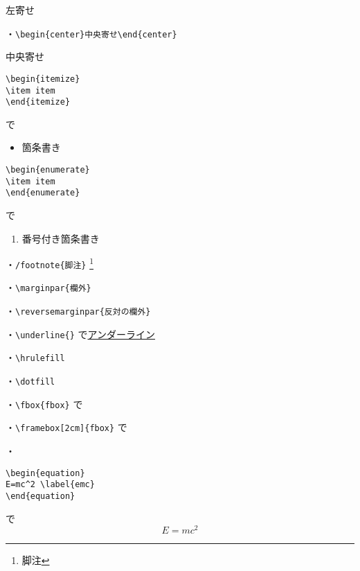 \documentclass[a4paper,12pt,papersize,twocolumn,titlepage]{jsarticle}
\begin{document}
\begin{flushleft}
  左寄せ
\end{flushleft}


・\verb"\begin{center}中央寄せ\end{center}"

\begin{center}
  中央寄せ
\end{center}


\begin{verbatim}
\begin{itemize}
\item item
\end{itemize}
\end{verbatim}
で

\begin{itemize}
  \item 箇条書き
\end{itemize}


\begin{verbatim}
\begin{enumerate}
\item item
\end{enumerate}
\end{verbatim}
で

\begin{enumerate}
  \item 番号付き箇条書き
\end{enumerate}


・\verb"/footnote{脚注}"
\footnote{脚注}


・\verb"\marginpar{欄外}"


・\verb"\reversemarginpar{反対の欄外}"{}


・\verb"\underline{}" で\underline{アンダーライン}


・\verb"\hrulefill"

\hrulefill


・\verb"\dotfill"

\dotfill


・\verb"\fbox{fbox}"
で


・\verb"\framebox[2cm]{fbox}"
で


・
\begin{verbatim}
\begin{equation}
E=mc^2 \label{emc}
\end{equation}
\end{verbatim}
で
\begin{equation}
  E=mc^2 \label{emc}
\end{equation}
\end{document}
